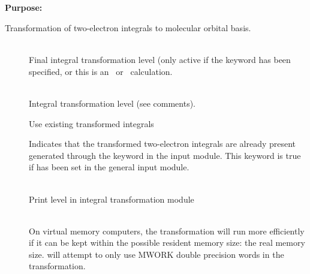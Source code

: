 \pagebreak[3]
\subsection{\label{ref-trainp}}

{\bf Purpose:}

Transformation of two-electron
integrals to molecular orbital
basis.

\begin{description}
\item[]
   \\
  Final integral transformation level (only active if the keyword
   has been specified, or this is an \aba\ or
  \resp\ calculation.

\item[]
   \\
  Integral transformation level (see comments).

\item[]
  Use existing transformed integrals

\item[]
Indicates that the transformed two-electron integrals are already
present generated through the keyword  in the
 input module. This keyword is true if
 has been set in the general input module.

\item[]
   \\
  Print level in integral transformation module

\item[]
   \\
  On virtual memory computers, the transformation will run more
  efficiently if it can be kept within the possible resident memory
  size: the real memory size.  {\sir} will attempt to only use MWORK
  double precision words in the transformation.
\end{description}



